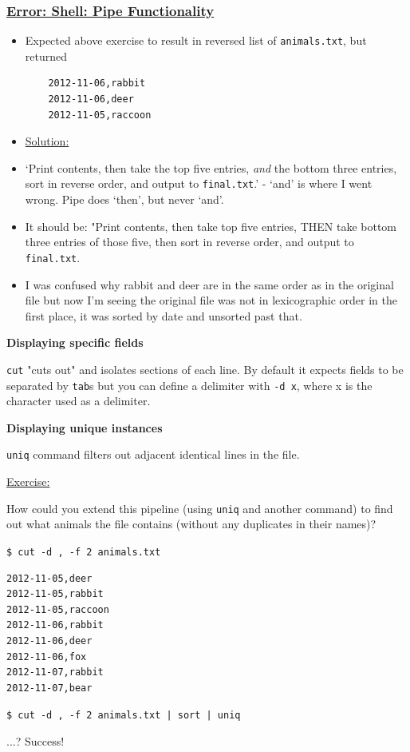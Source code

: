 \documentclass[12pt]{article}
\begin{document}
{\subsubsection{\texorpdfstring{\underline{Error: Shell: Pipe Functionality}}{}}\label{error:er17}
\begin{itemize}
  \item Expected above exercise to result in reversed list of \texttt{animals.txt}, but returned \begin{verbatim}
    2012-11-06,rabbit
    2012-11-06,deer
    2012-11-05,raccoon
  \end{verbatim} 
\end{itemize}
\begin{itemize}
\renewcommand{\labelitemi}{}
\item \underline{Solution:}
\renewcommand{\labelitemi}{$\bullet$}
  \item `Print contents, then take the top five entries, \textit{and} the bottom three entries, sort in reverse order, and output to \texttt{final.txt}.' - `and' is where I went wrong. Pipe does `then', but never `and'.
  \item It should be: "Print contents, then take top five entries, THEN take bottom three entries of those five, then sort in reverse order, and output to \texttt{final.txt}.
  \item I was confused why rabbit and deer are in the same order as in the original file but now I'm seeing the original file was not in lexicographic order in the first place, it was sorted by date and unsorted past that. 
\end{itemize}}

\textbf{Displaying specific fields}

\texttt{cut} "cuts out" and isolates sections of each line. By default it expects fields to be separated by \texttt{tab}s but you can define a delimiter with \texttt{-d x}, where x is the character used as a delimiter.

\textbf{Displaying unique instances}

\texttt{uniq} command filters out adjacent identical lines in the file.

\begin{addmargin}[1cm]{0cm}
\color{gray}
\vspace{1em}\underline{Exercise:}

How could you extend this pipeline (using \texttt{uniq} and another command) to find out what animals the file contains (without any duplicates in their names)?

\texttt{\$ cut -d , -f 2 animals.txt}

\begin{verbatim}
2012-11-05,deer
2012-11-05,rabbit
2012-11-05,raccoon
2012-11-06,rabbit
2012-11-06,deer
2012-11-06,fox
2012-11-07,rabbit
2012-11-07,bear
\end{verbatim}

\color{black}

\texttt{\$ cut -d , -f 2 animals.txt | sort | uniq}

...? Success!

\end{addmargin}
\end{document}
